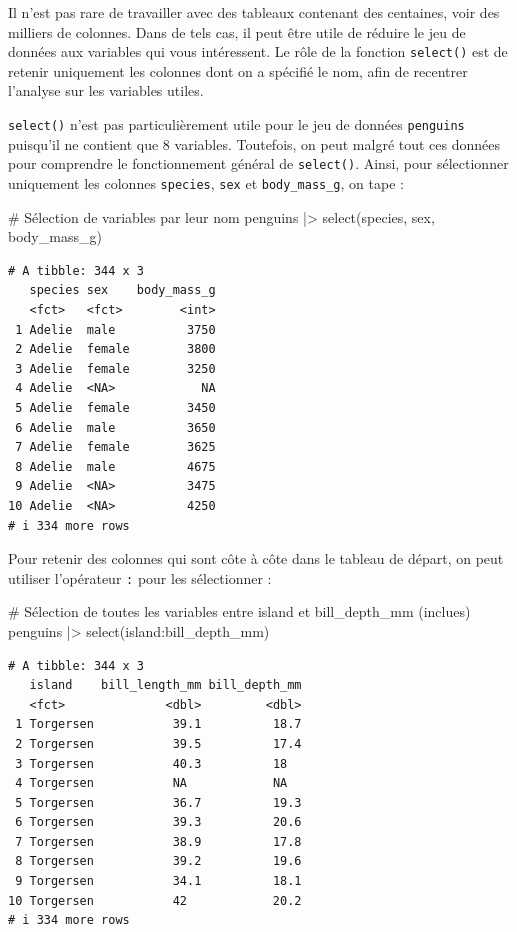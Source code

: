 \documentclass[
  a4paper,
  DIV=11,
  numbers=noendperiod,
  oneside]{scrreprt}
\newenvironment{Shaded}{}{}
\newcommand{\CommentTok}[1]{\textcolor[rgb]{0.42,0.45,0.49}{#1}}
\newcommand{\FunctionTok}[1]{\textcolor[rgb]{0.44,0.26,0.76}{#1}}
\newcommand{\NormalTok}[1]{\textcolor[rgb]{0.14,0.16,0.18}{#1}}
\newcommand{\SpecialCharTok}[1]{\textcolor[rgb]{0.00,0.36,0.77}{#1}}
\begin{document}
Il n'est pas rare de travailler avec des tableaux contenant des
centaines, voir des milliers de colonnes. Dans de tels cas, il peut être
utile de réduire le jeu de données aux variables qui vous intéressent.
Le rôle de la fonction \texttt{select()} est de retenir uniquement les
colonnes dont on a spécifié le nom, afin de recentrer l'analyse sur les
variables utiles.

\texttt{select()} n'est pas particulièrement utile pour le jeu de
données \texttt{penguins} puisqu'il ne contient que 8 variables.
Toutefois, on peut malgré tout ces données pour comprendre le
fonctionnement général de \texttt{select()}. Ainsi, pour sélectionner
uniquement les colonnes \texttt{species}, \texttt{sex} et
\texttt{body\_mass\_g}, on tape :

\begin{Shaded}
\begin{Highlighting}[]
\CommentTok{\# Sélection de variables par leur nom}
\NormalTok{penguins }\SpecialCharTok{|\textgreater{}}
  \FunctionTok{select}\NormalTok{(species, sex, body\_mass\_g)}
\end{Highlighting}
\end{Shaded}

\begin{verbatim}
# A tibble: 344 x 3
   species sex    body_mass_g
   <fct>   <fct>        <int>
 1 Adelie  male          3750
 2 Adelie  female        3800
 3 Adelie  female        3250
 4 Adelie  <NA>            NA
 5 Adelie  female        3450
 6 Adelie  male          3650
 7 Adelie  female        3625
 8 Adelie  male          4675
 9 Adelie  <NA>          3475
10 Adelie  <NA>          4250
# i 334 more rows
\end{verbatim}

Pour retenir des colonnes qui sont côte à côte dans le tableau de
départ, on peut utiliser l'opérateur \texttt{:} pour les sélectionner :

\begin{Shaded}
\begin{Highlighting}[]
\CommentTok{\# Sélection de toutes les variables entre \textasciigrave{}island\textasciigrave{} et \textasciigrave{}bill\_depth\_mm\textasciigrave{} (inclues)}
\NormalTok{penguins }\SpecialCharTok{|\textgreater{}}
  \FunctionTok{select}\NormalTok{(island}\SpecialCharTok{:}\NormalTok{bill\_depth\_mm)}
\end{Highlighting}
\end{Shaded}

\begin{verbatim}
# A tibble: 344 x 3
   island    bill_length_mm bill_depth_mm
   <fct>              <dbl>         <dbl>
 1 Torgersen           39.1          18.7
 2 Torgersen           39.5          17.4
 3 Torgersen           40.3          18  
 4 Torgersen           NA            NA  
 5 Torgersen           36.7          19.3
 6 Torgersen           39.3          20.6
 7 Torgersen           38.9          17.8
 8 Torgersen           39.2          19.6
 9 Torgersen           34.1          18.1
10 Torgersen           42            20.2
# i 334 more rows
\end{verbatim}
\end{document}
